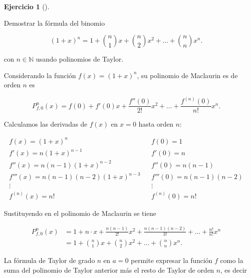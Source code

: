 \documentclass[
  spanish,
  a4paper,
]{scrreport}
\theoremstyle{definition}
\newtheorem{exercise}{Ejercicio}[chapter]
\theoremstyle{remark}
\begin{document}
\begin{exercise}[]\protect\hypertarget{exr-7}{}\label{exr-7}

Demostrar la fórmula del binomio

\[
(1+x)^n = 1+\binom{n}{1}x+ \binom{n}{2}x^2 + \ldots + \binom{n}{n}x^n.
\]

con \(n\in\mathbb{N}\) usando polinomios de Taylor.

\end{exercise}

\begin{tcolorbox}[enhanced jigsaw, arc=.35mm, bottomrule=.15mm, bottomtitle=1mm, breakable, colback=white, colbacktitle=quarto-callout-tip-color!10!white, colframe=quarto-callout-tip-color-frame, coltitle=black, left=2mm, leftrule=.75mm, opacityback=0, opacitybacktitle=0.6, rightrule=.15mm, title=\textcolor{quarto-callout-tip-color}{\faLightbulb}\hspace{0.5em}{Solución}, titlerule=0mm, toprule=.15mm, toptitle=1mm]

Considerando la función \(f(x) = (1+x)^n\), su polinomio de Maclaurin es
de orden \(n\) es

\[
P^n_{f,0}(x) = f(0) + f'(0)x + \frac{f''(0)}{2!}x^2 + \ldots + \frac{f^{(n)}(0)}{n!}x^n.
\]

Calculamos las derivadas de \(f(x)\) en \(x=0\) hasta orden \(n\):

\[
\begin{array}{lll}
f(x) = (1+x)^n & & f(0) = 1 \\
f'(x) = n(1+x)^{n-1} & & f'(0) = n \\
f''(x) = n(n-1)(1+x)^{n-2} & & f''(0) = n(n-1) \\
f'''(x) = n(n-1)(n-2)(1+x)^{n-3} & & f'''(0) = n(n-1)(n-2) \\
\vdots & & \vdots \\
f^{(n)}(x) = n! & & f^{(n)}(0) = n!
\end{array}
\]

Sustituyendo en el polinomio de Maclaurin se tiene

\begin{align*}
P^n_{f,0}(x) 
&= 1 + n\cdot x + \frac{n(n-1)}{2!}x^2 + \frac{n(n-1)(n-2)}{3!} + \ldots + \frac{n!}{n!}x^n \\
&= 1 + \binom{n}{1}x + \binom{n}{2}x^2 + \ldots + \binom{n}{n}x^n.
\end{align*}

La fórmula de Taylor de grado \(n\) en \(a=0\) permite expresar la
función \(f\) como la suma del polinomio de Taylor anterior más el resto
de Taylor de orden \(n\), es decir


\end{tcolorbox}
\end{document}

